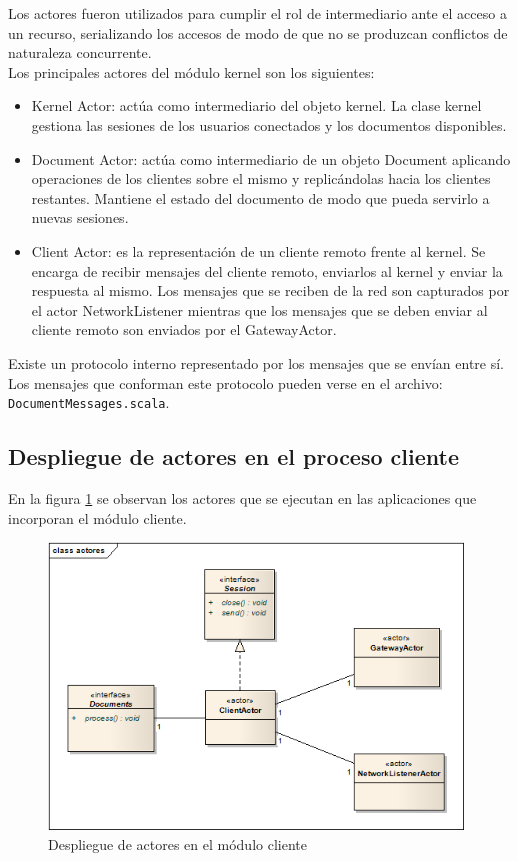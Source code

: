 \documentclass[12pt,a4paper]{article}
\begin{document}
Los actores fueron utilizados para cumplir el rol de intermediario ante el acceso a un recurso, serializando los accesos de
modo de que no se produzcan conflictos de naturaleza concurrente. \\

Los principales actores del módulo kernel son los siguientes:
\begin{itemize}
	\item Kernel Actor: actúa como intermediario del objeto kernel. La clase kernel gestiona las sesiones de los usuarios
	conectados y los documentos disponibles.
	\item Document Actor: actúa como intermediario de un objeto Document aplicando operaciones de los clientes sobre el mismo
	y replicándolas hacia los clientes restantes. Mantiene el estado del documento de modo que pueda servirlo a nuevas sesiones.
	\item Client Actor: es la representación de un cliente remoto frente al kernel. Se encarga de recibir mensajes del
	cliente remoto, enviarlos al kernel y enviar la respuesta al mismo. Los mensajes que se reciben de la red son capturados por
	el actor NetworkListener mientras que los mensajes que se deben enviar al cliente remoto son enviados por el GatewayActor.
\end{itemize}

Existe un protocolo interno representado por los mensajes que se envían entre sí. Los mensajes que conforman este protocolo
pueden verse en el archivo: \texttt{DocumentMessages.scala}.

\subsection{Despliegue de actores en el proceso cliente}
En la figura \ref{actores-cliente} se observan los actores que se ejecutan en las aplicaciones que incorporan el módulo cliente.

	\begin{figure}[!ht]
		\begin{center}
			\includegraphics[width=11cm]{actores-cliente.png}
			\caption{\label{actores-cliente} Despliegue de actores en el módulo cliente }
		\end{center}
	\end{figure}
\end{document}
